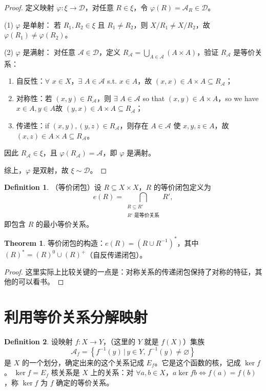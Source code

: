 \documentclass[oneside]{book}
\theoremstyle{definition}
\newtheorem{definition}{Definition}[section]
\newtheorem{theorem}{Theorem}[section]
\begin{document}
\begin{proof}
	定义映射 \( \varphi: \xi \to \mathscr{D} \)，对任意 \( R \in \xi \)，令 \( \varphi(R) =  \mathscr{A}_R\in\mathscr{D} \)。
	
	\noindent(1) \( \varphi \) 是单射：
	若 \( R_1, R_2 \in \xi \) 且 \( R_1 \neq R_2 \)，则 \( X/R_1 \neq X/R_2 \)，故 \( \varphi(R_1) \neq \varphi(R_2) \)。
	
	\noindent(2) \( \varphi \) 是满射：
	对任意 \( \mathscr{A} \in \mathscr{D} \)，定义 \( R_{\mathscr{A}} = \bigcup_{A \in \mathscr{A}} (A \times A) \)，验证 \( R_{\mathscr{A}} \) 是等价关系：
	\begin{enumerate}
		\item 自反性：\(\forall\) \( x \in X \)，\(\exists\) \( A \in \mathscr{A} \) s.t. \( x \in A \)，故 \( (x,x) \in A \times A \subseteq R_{\mathscr{A}} \)；
		\item 对称性：若 \( (x,y) \in R_{\mathscr{A}} \)，则 \(\exists\)  \( A \in \mathscr{A} \) so that \( (x,y) \in A \times A \)，so we have \(x\in A,y\in A\)故 \( (y,x) \in A \times A \subseteq R_{\mathscr{A}} \)；
		\item 传递性：if \( (x,y), (y,z) \in R_{\mathscr{A}} \)，则存在 \( A \in \mathscr{A} \) 使 \( x,y,z \in A \)，故 \( (x,z) \in A \times A \subseteq R_{\mathscr{A}} \)。
	\end{enumerate}
	因此 \( R_{\mathscr{A}} \in \xi \)，且 \( \varphi(R_{\mathscr{A}}) = \mathscr{A} \)，即 \( \varphi \) 是满射。
	
	综上，\( \varphi \) 是双射，故 \( \xi \sim \mathscr{D} \)。
\end{proof}


\begin{definition}
（等价闭包）设 \( R \subseteq X \times X \)，\( R \) 的等价闭包定义为
\[
e(R) = \bigcap_{\substack{R \subseteq R' \\ R' \text{ 是等价关系}}} R',
\]
即包含 \( R \) 的最小等价关系。
\end{definition}


\begin{theorem}
等价闭包的构造：\( e(R) = (R \cup R^{-1})^* \)，其中 \( (R)^* = (R)^0 \cup (R)^+ \)（自反传递闭包）。
\end{theorem}

\begin{proof}
这里实际上比较关键的一点是：对称关系的传递闭包保持了对称的特征，其他的可以看书。
\end{proof}


\section{利用等价关系分解映射}
\begin{definition}
	设映射 \( f: X \to Y \)，（这里的 \(Y\) 就是 \(f(X)\)）集族 
	\[\mathscr{A}_f=\left\{ f^{-1}(y) \,\big|\, y \in Y, \, f^{-1}(y) \neq \varnothing \right\} \] 
	是 \( X \) 的一个划分，确定出来的这个关系记成 \(E_f\)。它是这个函数的核，记成 \( \ker f \) 。 \( \ker f =E_f\) 
	核关系是 \( X \) 上的关系：对 \( \forall a,b \in X \)，\( a \ker f b \iff f(a) = f(b) \)，称 \( \ker f \) 为 \( f \) 确定的等价关系。
\end{definition}
\end{document}

